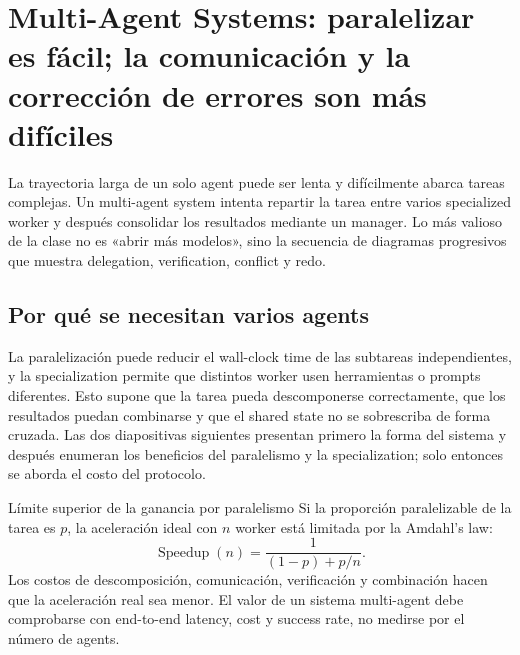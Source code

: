 \section{Multi-Agent Systems: paralelizar es fácil; la comunicación y la corrección de errores son más difíciles}

La trayectoria larga de un solo agent puede ser lenta y difícilmente abarca tareas complejas. Un multi-agent system intenta repartir la tarea entre varios specialized worker y después consolidar los resultados mediante un manager. Lo más valioso de la clase no es «abrir más modelos», sino la secuencia de diagramas progresivos que muestra delegation, verification, conflict y redo.

\subsection{Por qué se necesitan varios agents}

La paralelización puede reducir el wall-clock time de las subtareas independientes, y la specialization permite que distintos worker usen herramientas o prompts diferentes. Esto supone que la tarea pueda descomponerse correctamente, que los resultados puedan combinarse y que el shared state no se sobrescriba de forma cruzada. Las dos diapositivas siguientes presentan primero la forma del sistema y después enumeran los beneficios del paralelismo y la specialization; solo entonces se aborda el costo del protocolo.



\begin{importantbox}{Límite superior de la ganancia por paralelismo}
Si la proporción paralelizable de la tarea es $p$, la aceleración ideal con $n$ worker está limitada por la Amdahl's law:
\[
\operatorname{Speedup}(n)=\frac{1}{(1-p)+p/n}.
\]
Los costos de descomposición, comunicación, verificación y combinación hacen que la aceleración real sea menor. El valor de un sistema multi-agent debe comprobarse con end-to-end latency, cost y success rate, no medirse por el número de agents.
\end{importantbox}


